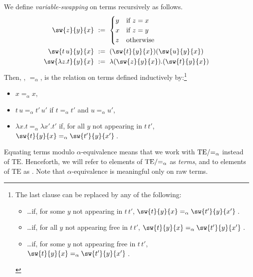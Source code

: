 \documentclass{svmult}
\begin{document}
\begin{mydefinition}
We define \emph{variable-swapping} on terms recursively as follows.
\begin{align*}
\sw{z}{y}{x}  \ &:=\ \begin{cases}y & \text{if }z=x \\ x & \text{if }z=y \\ z & \text{otherwise}\end{cases} \\
\sw{t\,u}{y}{x} \ &:=\ (\sw{t}{y}{x})(\sw{u}{y}{x}) \\
\sw{\lambda z. t}{y}{x} \ &:=\ \lambda(\sw{z}{y}{x}).(\sw{t}{y}{x})
\end{align*}
Then, , $=_\alpha$, is the relation on terms defined inductively by:\footnote{%
The last clause can be replaced by any of the following:
\begin{itemize}
    \item \dots if, for some $y$ not appearing in $t\,t'$, $\sw{t}{y}{x}=_\alpha \sw{t'}{y}{x'}$\,.
    \item \dots if, for all $y$ not appearing free in $t\,t'$, $\sw{t}{y}{x}=_\alpha \sw{t'}{y}{x'}$\,.
    \item \dots if, for some $y$ not appearing free in $t\,t'$, $\sw{t}{y}{x}=_\alpha \sw{t'}{y}{x'}$\,.
\end{itemize}}
%
\begin{itemize}
  \item $x=_{\alpha}x$,
  \item $t\,u=_{\alpha}t'\,u'$ if $t=_{\alpha}t'$ and $u=_{\alpha}u'$,
  \item $\lambda x.t=_\alpha\lambda x'.t'$ if,  for all $y$ not appearing in $t\,t'$, $\sw{t}{y}{x}=_\alpha \sw{t'}{y}{x'}$\,. \deq
\end{itemize}
\end{mydefinition}
%
Equating terms modulo $\alpha$-equivalence means that we work with $\mathrm{TE}/\mathnormal{=_\alpha}$ instead of $\mathrm{TE}$.
Henceforth, we will refer to elements of $\mathrm{TE}/\mathnormal{=_\alpha}$ as \emph{terms}, and to elements of $\mathrm{TE}$ as . Note that $\alpha$-equivalence is meaningful only on raw terms.
\end{document}
